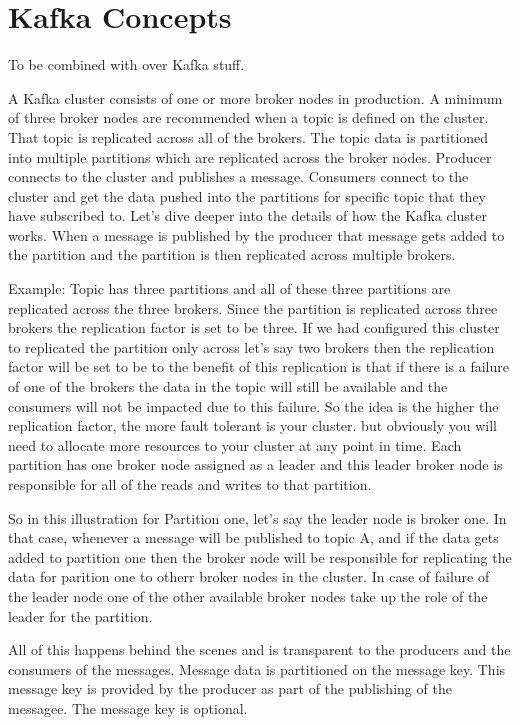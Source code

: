 \section{Kafka Concepts}
To be combined with over Kafka stuff.

A Kafka cluster consists of one or more broker nodes in production.
A minimum of three broker nodes are recommended when a topic is defined on the cluster.
That topic is replicated across all of the brokers.
The topic data is partitioned into multiple partitions which are replicated across the broker nodes.
Producer connects to the cluster and publishes a message.
Consumers connect to the cluster and get the data pushed into the partitions for specific topic that they have subscribed to.
Let's dive deeper into the details of how the Kafka cluster works.
When a message is published by the producer that message gets added to the partition and the partition is then replicated across multiple brokers.

Example:
Topic has three partitions and all of these three partitions are replicated across the three brokers.
Since the partition is replicated across three brokers the replication factor is set to be three.
If we had configured this cluster to replicated the partition only across let's say two brokers then the replication factor will be set to be to the benefit of this replication is that if there is a failure of one of the brokers the data in the topic will still be available and the consumers will not be impacted due to this failure.
So the idea is the higher the replication factor, the more fault tolerant is your cluster.
but obviously you will need to allocate more resources to your cluster at any point in time.
Each partition has one broker node assigned as a leader and this leader broker node is responsible for all of the reads and writes to that partition.

So in this illustration for Partition one, let's say the leader node is broker one.
In that case, whenever a message will be published to topic A, and if the data gets added to partition one then the broker node will be responsible for replicating
the data for parition one to otherr broker nodes in the cluster.
In case of failure of the leader node one of the other available broker nodes take up the role of the leader for the partition.

All of this happens behind the scenes and is transparent to the producers and the consumers of the messages.
Message data is partitioned on the message key.
This message key is provided by the producer as part of the publishing of the messagee.
The message key is optional.

